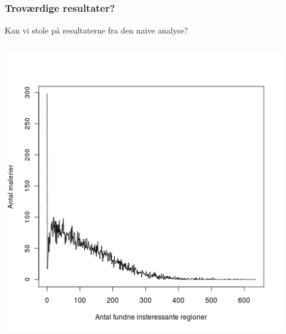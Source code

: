 \documentclass[xcolor=table]{beamer}
\begin{document}
\subsection*{}
\begin{frame}

    \frametitle{Troværdige resultater?}

    Kan vi stole på resultaterne fra den naive analyse?

    \begin{columns}[t]
        \begin{block}{}
            \centering
            \includegraphics[width=0.98\textwidth]{billeder/totalregions_var}
        \end{block}



\end{columns}
\end{frame}
\end{document}
